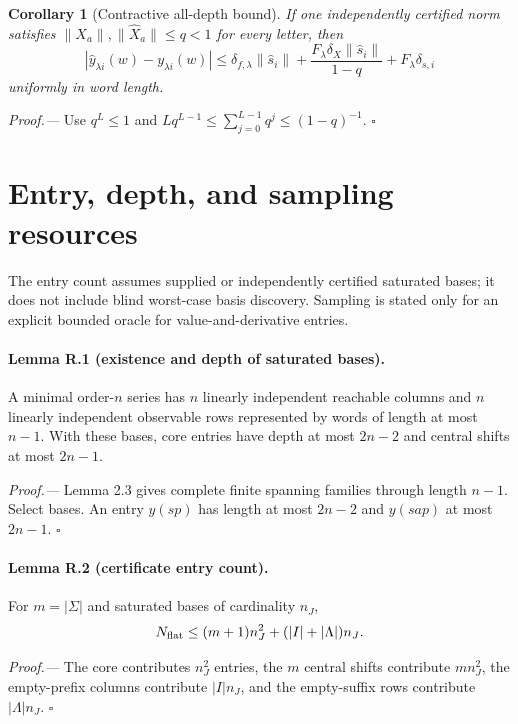 \documentclass[aps,prl,onecolumn,superscriptaddress,nofootinbib]{revtex4-2}
\newtheorem{corollary}{Corollary}
\begin{document}
\begin{corollary}[Contractive all-depth bound]
\label{cor:contractive}
If one independently certified norm satisfies
$\|X_a\|,\|\widehat X_a\|\le q<1$ for every letter, then
\begin{equation}
 |\widehat y_{\lambda i}(w)-y_{\lambda i}(w)|
 \le \delta_{f,\lambda}\|\widehat s_i\|
 +\frac{F_\lambda\delta_X\|\widehat s_i\|}{1-q}
 +F_\lambda\delta_{s,i}
 \label{eq:contractive-bound}
\end{equation}
uniformly in word length.
\end{corollary}

\emph{Proof.---}
Use $q^L\le1$ and
$Lq^{L-1}\le\sum_{j=0}^{L-1}q^j\le(1-q)^{-1}$. \hfill$\square$

\section{Entry, depth, and sampling resources}
\label{sec:resource}

The entry count assumes supplied or independently certified saturated bases; it does not include blind worst-case basis discovery.  Sampling is stated only for an explicit bounded oracle for value-and-derivative entries.

\paragraph{Lemma R.1 (existence and depth of saturated bases).}
A minimal order-$n$ series has $n$ linearly independent reachable columns and $n$ linearly independent observable rows represented by words of length at most $n-1$.  With these bases, core entries have depth at most $2n-2$ and central shifts at most $2n-1$.

\emph{Proof.---}
Lemma 2.3 gives complete finite spanning families through length $n-1$.  Select bases.  An entry $y(sp)$ has length at most $2n-2$ and $y(sap)$ at most $2n-1$. \hfill$\square$

\paragraph{Lemma R.2 (certificate entry count).}
For $m=|\Sigma|$ and saturated bases of cardinality $n_J$,
\begin{equation}
 N_{\rm flat}\le(m+1)n_J^2+(|I|+|\Lambda|)n_J.
 \label{eq:Nflat-SM}
\end{equation}

\emph{Proof.---}
The core contributes $n_J^2$ entries, the $m$ central shifts contribute $mn_J^2$, the empty-prefix columns contribute $|I|n_J$, and the empty-suffix rows contribute $|\Lambda|n_J$. \hfill$\square$
\end{document}
